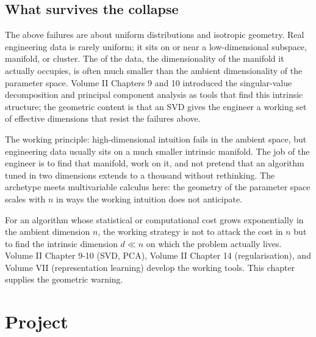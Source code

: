 \subsection{What survives the collapse}

The above failures are about uniform distributions and isotropic
geometry. Real engineering data is rarely uniform; it sits on or
near a low-dimensional subspace, manifold, or cluster. The
 of the data, the dimensionality
of the manifold it actually occupies, is often much smaller than
the ambient dimensionality of the parameter space. Volume II
Chapters 9 and 10 introduced the singular-value decomposition and
principal component analysis as tools that find this intrinsic
structure; the geometric content is that an SVD gives the engineer
a working set of effective dimensions that resist the failures
above.

The working principle: high-dimensional intuition fails in the
ambient space, but engineering data usually sits on a much smaller
intrinsic manifold. The job of the engineer is to find that
manifold, work on it, and not pretend that an algorithm tuned in
two dimensions extends to a thousand without rethinking. The
 archetype meets multivariable calculus here: the
geometry of the parameter space scales with $n$ in ways the working
intuition does not anticipate.

\begin{principle}
For an algorithm whose statistical or computational cost grows
exponentially in the ambient dimension $n$, the working strategy is
not to attack the cost in $n$ but to find the intrinsic dimension
$d \ll n$ on which the problem actually lives. Volume II Chapter
9-10 (SVD, PCA), Volume II Chapter 14 (regularisation), and
Volume VII (representation learning) develop the working tools.
This chapter supplies the geometric warning.
\end{principle}

\section{Project}

